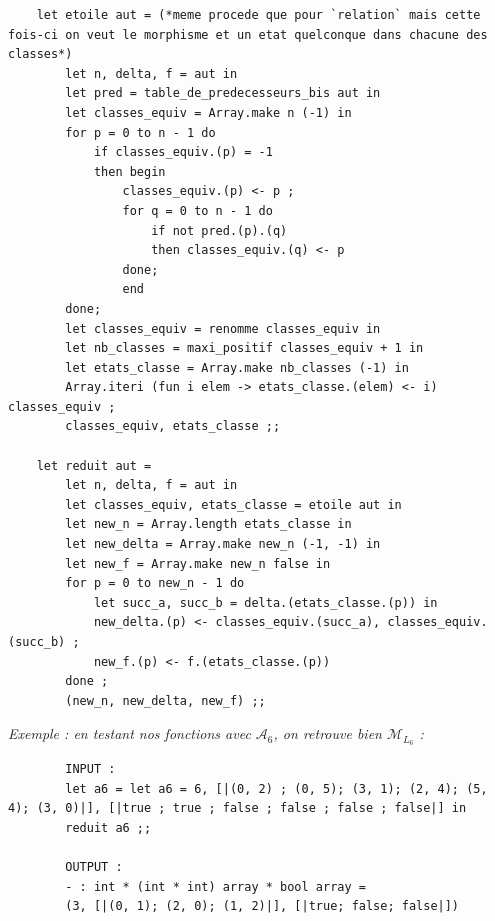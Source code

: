 \documentclass{article}
\begin{document}
\begin{enumerate}
\begin{verbatim}
    let etoile aut = (*meme procede que pour `relation` mais cette fois-ci on veut le morphisme et un etat quelconque dans chacune des classes*)
        let n, delta, f = aut in
        let pred = table_de_predecesseurs_bis aut in
        let classes_equiv = Array.make n (-1) in
        for p = 0 to n - 1 do
            if classes_equiv.(p) = -1
            then begin 
                classes_equiv.(p) <- p ;
                for q = 0 to n - 1 do 
                    if not pred.(p).(q) 
                    then classes_equiv.(q) <- p
                done;
                end
        done;
        let classes_equiv = renomme classes_equiv in
        let nb_classes = maxi_positif classes_equiv + 1 in
        let etats_classe = Array.make nb_classes (-1) in
        Array.iteri (fun i elem -> etats_classe.(elem) <- i) classes_equiv ;
        classes_equiv, etats_classe ;;

    let reduit aut = 
        let n, delta, f = aut in 
        let classes_equiv, etats_classe = etoile aut in
        let new_n = Array.length etats_classe in
        let new_delta = Array.make new_n (-1, -1) in 
        let new_f = Array.make new_n false in 
        for p = 0 to new_n - 1 do
            let succ_a, succ_b = delta.(etats_classe.(p)) in 
            new_delta.(p) <- classes_equiv.(succ_a), classes_equiv.(succ_b) ;
            new_f.(p) <- f.(etats_classe.(p))
        done ;
        (new_n, new_delta, new_f) ;;
    \end{verbatim}

    \textit{Exemple : en testant nos fonctions avec $\mathcal{A}_6$, on retrouve bien $\mathcal{M}_{L_6}$ :} \newline
    \begin{verbatim}
        INPUT :
        let a6 = let a6 = 6, [|(0, 2) ; (0, 5); (3, 1); (2, 4); (5, 4); (3, 0)|], [|true ; true ; false ; false ; false ; false|] in
        reduit a6 ;;

        OUTPUT : 
        - : int * (int * int) array * bool array =
        (3, [|(0, 1); (2, 0); (1, 2)|], [|true; false; false|])
    \end{verbatim}
\end{enumerate}
\end{document}

